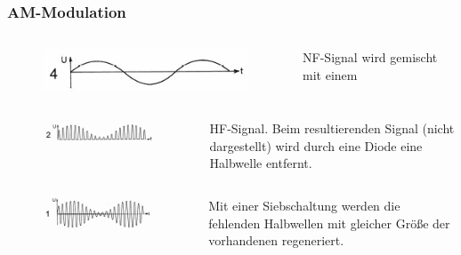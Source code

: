 \begin{frame}
  \frametitle{AM-Modulation}

  \begin{columns}
    \begin{figure}
      \includegraphics[width=\textwidth,height=.25\textheight,keepaspectratio]{a12/td503d.png}
    \end{figure}
    NF-Signal wird gemischt mit einem
  \end{columns}
  \begin{columns}
    \begin{figure}
      \includegraphics[width=\textwidth,height=.25\textheight,keepaspectratio]{a12/td503b.png}
    \end{figure}
    HF-Signal. Beim resultierenden Signal (nicht dargestellt) wird durch eine Diode eine Halbwelle entfernt. 
  \end{columns}
  \begin{columns}
    \begin{figure}
      \includegraphics[width=\textwidth,height=.25\textheight,keepaspectratio]{a12/td503a.png}
    \end{figure}
    Mit einer Siebschaltung werden die fehlenden Halbwellen mit gleicher Größe der vorhandenen regeneriert.
  \end{columns}
\end{frame}


